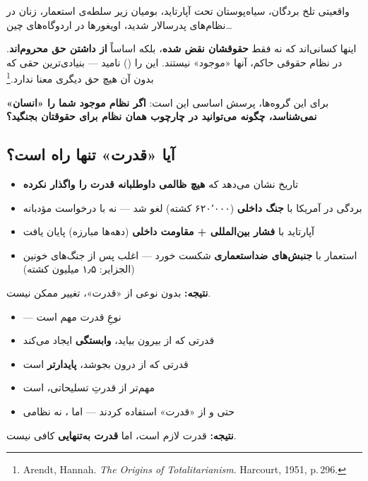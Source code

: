 \begin{histQuote}{واقعیتی تلخ}
بردگان، سیاه‌پوستان تحت آپارتاید، بومیان زیر سلطه‌ی استعمار، زنان در
نظام‌های پدرسالار شدید، اویغورها در اردوگاه‌های چین\ldots

اینها کسانی‌اند که نه فقط \textbf{حقوقشان نقض شده}، بلکه اساساً
\textbf{از داشتن حق محروم‌اند}. در نظام حقوقی حاکم، آنها «موجود» نیستند.
 این را 
() نامید — بنیادی‌ترین حقی که بدون آن هیچ
حق دیگری معنا ندارد.\footnote{Arendt, Hannah.
\textit{The Origins of Totalitarianism}. Harcourt, 1951, p.\,296.}
\end{histQuote}

برای این گروه‌ها، پرسش اساسی این است: \textbf{اگر نظام موجود شما را
«انسان» نمی‌شناسد، چگونه می‌توانید در چارچوب همان نظام برای حقوقتان
بجنگید؟}

\subsection{آیا «قدرت» تنها راه است؟}

\begin{tcolorbox}[failbox, title={نگاه واقع‌گرایانه}]
\begin{itemize}
\item تاریخ نشان می‌دهد که \textbf{هیچ ظالمی داوطلبانه قدرت را واگذار
نکرده}
\item بردگی در آمریکا با \textbf{جنگ داخلی}
(۶۲۰٬۰۰۰ کشته) لغو شد — نه با درخواست مؤدبانه
\item آپارتاید با \textbf{فشار بین‌المللی + مقاومت داخلی}
(دهه‌ها مبارزه) پایان یافت
\item استعمار با \textbf{جنبش‌های ضداستعماری} شکست خورد — اغلب پس از
جنگ‌های خونین (الجزایر: ۱٫۵ میلیون کشته)
\end{itemize}
\textbf{نتیجه:} بدون نوعی از «قدرت»، تغییر ممکن نیست.
\end{tcolorbox}

\begin{tcolorbox}[successbox, title={نگاه انتقادی}]
\begin{itemize}
\item {} — نوعِ قدرت مهم است
\item قدرتی که از بیرون بیاید، \textbf{وابستگی} ایجاد می‌کند
\item قدرتی که از درون بجوشد، \textbf{پایدارتر} است
\item مهم‌تر از قدرتِ تسلیحاتی،  است
\item حتی  و  از «قدرت» استفاده
کردند — اما ، نه نظامی
\end{itemize}
\textbf{نتیجه:} قدرت لازم است، اما \textbf{قدرت به‌تنهایی} کافی نیست.
\end{tcolorbox}


